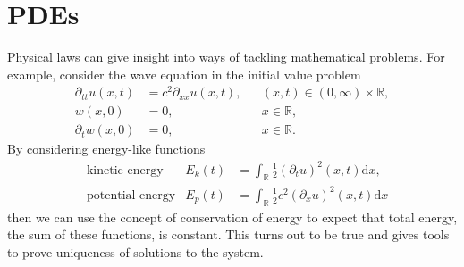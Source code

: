 \documentclass[a4paper,11pt]{article}
\begin{document}
\section{PDEs}

Physical laws can give insight into ways of tackling mathematical problems. For example, consider the wave equation in the initial value problem \begin{align*}
\partial_{tt} u(x,t) &= c^2 \partial_{xx} u(x,t), & & (x,t) \in (0, \infty) \times \mathbb{R}, \\
w(x,0)               &= 0,                        & & x \in \mathbb{R}, \\
\partial_tw(x,0)     &= 0,                        & & x \in \mathbb{R}.
\end{align*}
By considering energy-like functions \begin{align*}
&\text{kinetic energy}   & E_k(t) &= \int_\mathbb{R} \tfrac{1}{2}     (\partial_t u)^2 (x,t) \mathrm{d}x, \\
&\text{potential energy} & E_p(t) &= \int_\mathbb{R} \tfrac{1}{2} c^2 (\partial_x u)^2 (x,t) \mathrm{d}x
\end{align*}
then we can use the concept of conservation of energy to expect that total energy, the sum of these functions, is constant. This turns out to be true and gives tools to prove uniqueness of solutions to the system.
\end{document}
